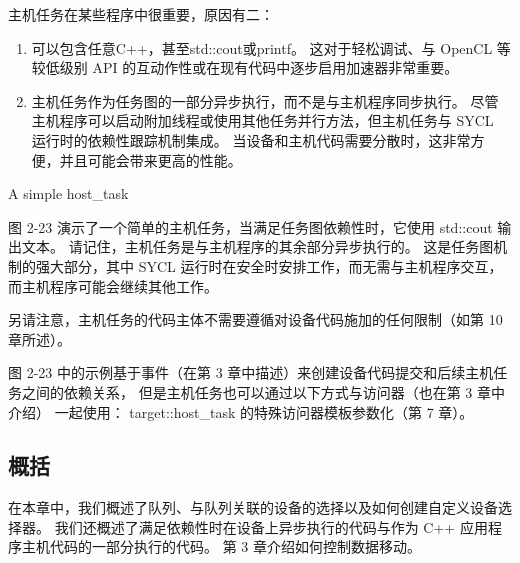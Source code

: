 主机任务在某些程序中很重要，原因有二：
\begin{enumerate}
	\item 可以包含任意C++，甚至std::cout或printf。 
	这对于轻松调试、与 OpenCL 等较低级别 API 的互动作性或在现有代码中逐步启用加速器非常重要。

	\item 主机任务作为任务图的一部分异步执行，而不是与主机程序同步执行。 
	尽管主机程序可以启动附加线程或使用其他任务并行方法，但主机任务与 SYCL 运行时的依赖性跟踪机制集成。 
	当设备和主机代码需要分散时，这非常方便，并且可能会带来更高的性能。
\end{enumerate}

{\color{red} A simple host\_task }

图 2-23 演示了一个简单的主机任务，当满足任务图依赖性时，它使用 std::cout 输出文本。 
请记住，主机任务是与主机程序的其余部分异步执行的。 
这是任务图机制的强大部分，其中 SYCL 运行时在安全时安排工作，而无需与主机程序交互，而主机程序可能会继续其他工作。

另请注意，主机任务的代码主体不需要遵循对设备代码施加的任何限制（如第 10 章所述）。

图 2-23 中的示例基于事件（在第 3 章中描述）来创建设备代码提交和后续主机任务之间的依赖关系，
但是主机任务也可以通过以下方式与访问器（也在第 3 章中介绍）
一起使用： target::host\_task 的特殊访问器模板参数化（第 7 章）。

\subsection{概括}
在本章中，我们概述了队列、与队列关联的设备的选择以及如何创建自定义设备选择器。 
我们还概述了满足依赖性时在设备上异步执行的代码与作为 C++ 应用程序主机代码的一部分执行的代码。 
第 3 章介绍如何控制数据移动。